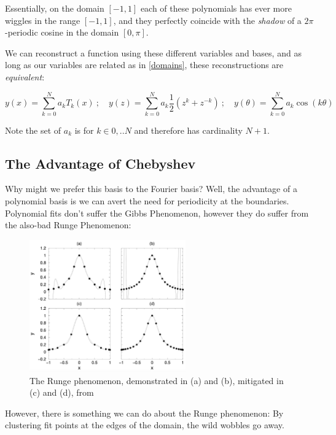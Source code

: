 \documentclass[10pt]{article}
\begin{document}
Essentially, on the domain $[-1, 1]$ each of these polynomials has ever more wiggles in the range $[-1, 1]$, and they perfectly coincide with the \textit{shadow} of a $2\pi$-periodic cosine in the domain $[0, \pi]$.

We can reconstruct a function using these different variables and bases, and as long as our variables are related as in \autoref{domains}, these reconstructions are \textit{equivalent}:

\begin{equation}\label{equivalent}
y(x) = \sum_{k=0}^N a_k T_k(x)\ ;\quad y(z) = \sum_{k=0}^N a_k \frac{1}{2}(z^k + z^{-k})\ ;\quad y(\theta) = \sum_{k=0}^N a_k \cos(k \theta)
\end{equation}

Note the set of ${a_k}$ is for $k \in {0, .. N}$ and therefore has cardinality $N+1$.\newline

\subsection{The Advantage of Chebyshev}

Why might we prefer this basis to the Fourier basis? Well, the advantage of a polynomial basis is we can avert the need for periodicity at the boundaries. Polynomial fits don't suffer the Gibbs Phenomenon, however they do suffer from the also-bad Runge Phenomenon\cite{kutz}:

\begin{figure}[h!]
	\centering
	\includegraphics[width=0.6\textwidth]{runge.png}
	\captionsetup{width=0.6\textwidth}
	\caption*{The Runge phenomenon, demonstrated in (a) and (b), mitigated in (c) and (d), from \cite{kutz}}
\end{figure}

However, there is something we can do about the Runge phenomenon: By clustering fit points at the edges of the domain, the wild wobbles go away.
\end{document}
